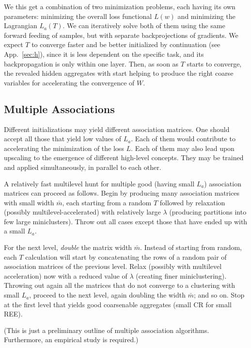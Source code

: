 \documentclass{article} %
\begin{document}
We this get a combination of two minimization problems, each having its own parameters: minimizing the overall loss functional $L(w)$ and minimizing the Lagrangian $L_a(T)$. We can iteratively solve both of them using the same forward feeding of samples, but with separate backprojections of gradients. We expect $T$ to converge faster and be better initialized by continuation (see App.~\ref{sec:h}), since it is less dependent on the specific task, and its backpropagation is only within one layer. Then, as soon as $T$ starts to converge, the revealed hidden aggregates with start helping to produce the right coarse variables for accelerating the convergence of $W$.

\subsection{Multiple Associations}
\label{sec:G.5}
Different initializations may yield different association matrices. One should accept all those that yield low values of $L_a$. Each of them would contribute to accelerating the minimization of the loss $L$. Each of them may also lead upon upscaling to the emergence of different high-level concepts. They may be trained and applied simultaneously, in parallel to each other.

A relatively fast multilevel hunt for multiple good (having small $L_a$) association matrices can proceed as follows. Begin by producing many association matrices with small width $\bar{m}$, each starting from a random $T$ followed by relaxation (possibly multilevel-accelerated) with relatively large $\lambda$ (producing partitions into few large miniclusters). Throw out all cases except those that have ended up with a small $L_a$.

For the next level, {\it double} the matrix width $\bar{m}$. Instead of starting from random, each $T$ calculation will start by concatenating the rows of a random pair of association matrices of the previous level. Relax (possibly with multilevel acceleration) now with a reduced value of $\lambda$ (creating finer miniclustering). Throwing out again all the matrices that do not converge to a clustering with small $L_a$, proceed to the next level, again doubling the width $\bar{m}$; and so on. Stop at the first level that yields good coarsenable aggregates (small CR for small REE).

(This is just a preliminary outline of multiple association algorithms. Furthermore, an empirical study is required.)
\end{document}
